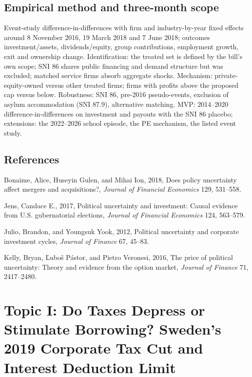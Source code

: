 \documentclass[12pt,a4paper]{article}
\newenvironment{refs}{\begin{list}{}{\setlength{\leftmargin}{1.5em}\setlength{\itemindent}{-1.5em}\setlength{\itemsep}{1pt}}}{\end{list}}
\begin{document}
\subsection{Empirical method and three-month scope}

Event-study difference-in-differences with firm and industry-by-year fixed effects around 8 November 2016, 19 March 2018 and 7 June 2018; outcomes investment/assets, dividends/equity, group contributions, employment growth, exit and ownership change. Identification: the treated set is defined by the bill's own scope; SNI 86 shares public financing and demand structure but was excluded; matched service firms absorb aggregate shocks. Mechanism: private-equity-owned versus other treated firms; firms with profits above the proposed cap versus below. Robustness: SNI 86, pre-2016 pseudo-events, exclusion of asylum accommodation (SNI 87.9), alternative matching. MVP: 2014--2020 difference-in-differences on investment and payouts with the SNI 86 placebo; extensions: the 2022--2026 school episode, the PE mechanism, the listed event study.

\subsection*{References}
\begin{refs}
\item Bonaime, Alice, Huseyin Gulen, and Mihai Ion, 2018, Does policy uncertainty affect mergers and acquisitions?, \emph{Journal of Financial Economics} 129, 531--558.
\item Jens, Candace E., 2017, Political uncertainty and investment: Causal evidence from U.S. gubernatorial elections, \emph{Journal of Financial Economics} 124, 563--579.
\item Julio, Brandon, and Youngsuk Yook, 2012, Political uncertainty and corporate investment cycles, \emph{Journal of Finance} 67, 45--83.
\item Kelly, Bryan, \v{L}ubo\v{s} P\'astor, and Pietro Veronesi, 2016, The price of political uncertainty: Theory and evidence from the option market, \emph{Journal of Finance} 71, 2417--2480.
\end{refs}

\newpage

\section{Topic I: Do Taxes Depress or Stimulate Borrowing? Sweden's 2019 Corporate Tax Cut and Interest Deduction Limit}
\end{document}
